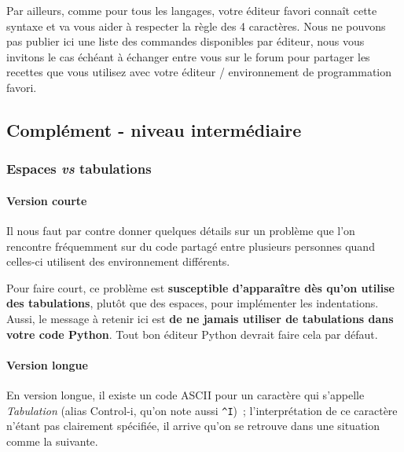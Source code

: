Par ailleurs, comme pour tous les langages, votre éditeur favori connaît
cette syntaxe et va vous aider à respecter la règle des 4 caractères.
Nous ne pouvons pas publier ici une liste des commandes disponibles par
éditeur, nous vous invitons le cas échéant à échanger entre vous sur le
forum pour partager les recettes que vous utilisez avec votre éditeur /
environnement de programmation favori.

    \hypertarget{compluxe9ment---niveau-intermuxe9diaire}{%
\subsection{Complément - niveau
intermédiaire}\label{compluxe9ment---niveau-intermuxe9diaire}}

    \hypertarget{espaces-vs-tabulations}{%
\subsubsection{\texorpdfstring{Espaces \emph{vs}
tabulations}{Espaces vs tabulations}}\label{espaces-vs-tabulations}}

    \hypertarget{version-courte}{%
\paragraph{Version courte}\label{version-courte}}

    Il nous faut par contre donner quelques détails sur un problème que l'on
rencontre fréquemment sur du code partagé entre plusieurs personnes
quand celles-ci utilisent des environnement différents.

Pour faire court, ce problème est \textbf{susceptible d'apparaître dès
qu'on utilise des tabulations}, plutôt que des espaces, pour implémenter
les indentations. Aussi, le message à retenir ici est \textbf{de ne
jamais utiliser de tabulations dans votre code Python}. Tout bon éditeur
Python devrait faire cela par défaut.

    \hypertarget{version-longue}{%
\paragraph{Version longue}\label{version-longue}}

    En version longue, il existe un code ASCII pour un caractère qui
s'appelle \emph{Tabulation} (alias Control-i, qu'on note aussi
\texttt{\^{}I})~; l'interprétation de ce caractère n'étant pas
clairement spécifiée, il arrive qu'on se retrouve dans une situation
comme la suivante.

